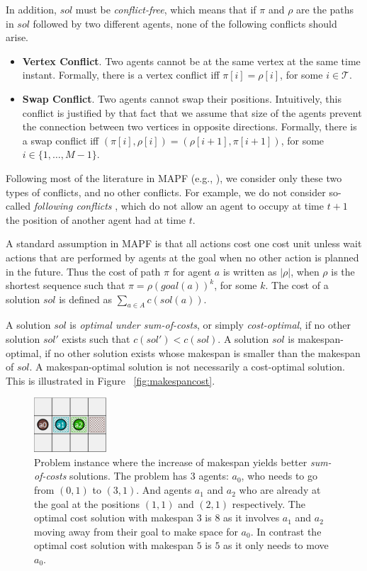 In addition, $sol$ must be \emph{conflict-free}, which means that if $\pi$ and $\rho$ are the paths in $sol$ followed by two different agents, none of the following conflicts should arise.
\begin{itemize}
    \item \textbf{Vertex Conflict}. Two agents cannot be at the same vertex at the same time instant. Formally, there is a vertex conflict iff $\pi[i]=\rho[i]$, for some $i\in\mathcal{T}$.
    \item \textbf{Swap Conflict}. Two agents cannot swap their positions. Intuitively, this conflict is justified by that fact that we assume that size of the agents prevent the connection between two vertices in opposite directions. Formally, there is a swap conflict iff $(\pi[i],\rho[i])=(\rho[i+1],\pi[i+1])$, for some $i\in\{1,\ldots,M-1\}$.
\end{itemize}
Following most of the literature in MAPF (e.g., ), we consider only these two types of conflicts, and no other conflicts. For example, we do not consider so-called \emph{following conflicts} \cite{SternSFK0WLA0KB19}, which do not allow an agent to occupy at time $t+1$ the position of another agent had at time $t$.

A standard assumption in MAPF is that all actions cost one cost unit unless wait actions that are performed by agents at the goal when no other action is planned in the future. Thus the cost of path $\pi$ for agent $a$ is written as $|\rho|$, when $\rho$ is the shortest sequence such that $\pi=\rho(goal(a))^k$, for some $k$. The cost of a solution $sol$ is defined as $\sum_{a\in A} c(sol(a))$.

A solution $sol$ is \emph{optimal under sum-of-costs}, or simply \emph{cost-optimal}, if no other solution $sol'$ exists such that $c(sol')<c(sol)$. A solution $sol$ is makespan-optimal, if no other solution exists whose makespan is smaller than the makespan of $sol$. A makespan-optimal solution is not necessarily a cost-optimal solution. This is illustrated in Figure ~\ref{fig:makespancost}.

\begin{figure}
    \centering
    \includegraphics[width=0.24\textwidth]{graphs/makespangrid.PNG}
      \caption{Problem instance where the increase of makespan yields better \emph{sum-of-costs} solutions. The problem has 3 agents:  $a_0$, who needs to go from $(0,1)$ to $(3,1)$. And agents $a_1$ and $a_2$ who are already at the goal at the positions $(1,1)$ and $(2,1)$ respectively. The optimal cost solution with makespan $3$ is $8$ as it involves $a_1$ and $a_2$ moving away from their goal to make space for $a_0$. In contrast the optimal cost solution with makespan $5$ is $5$ as it only needs to move $a_0$.}
    \label{makespancost}
\end{figure}


